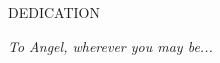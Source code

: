 \newpage
{}

\begin{center}
DEDICATION
\end{center}

\begin{center}
\textit{To Angel, wherever you may be...}
\end{center}
